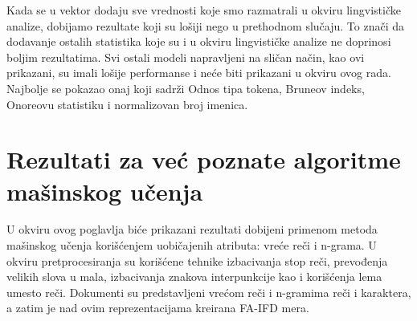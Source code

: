 \documentclass[12pt,oneside]{memoir}
\begin{document}
\noindent{}
\newline
\newline
Kada se u vektor dodaju sve vrednosti koje smo razmatrali u okviru lingvističke analize,  dobijamo rezultate koji su lošiji nego u prethodnom slučaju. To znači da dodavanje ostalih statistika koje su i u okviru lingvističke analize ne doprinosi boljim rezultatima.  Svi ostali modeli napravljeni na sličan način, kao ovi prikazani, su imali lošije performanse i neće biti prikazani u okviru ovog rada.  Najbolje se pokazao onaj koji sadrži Odnos tipa tokena, Bruneov indeks, Onoreovu statistiku i normalizovan broj imenica. 
\newpage
\section{Rezultati za već poznate algoritme mašinskog učenja}

U okviru ovog poglavlja biće prikazani rezultati dobijeni primenom metoda mašinskog učenja korišćenjem uobičajenih atributa: vreće reči i n-grama.  U okviru pretprocesiranja su korišćene tehnike izbacivanja stop reči,  prevođenja velikih slova u mala,  izbacivanja znakova interpunkcije kao i korišćenja lema umesto reči.  Dokumenti su predstavljeni vrećom reči i n-gramima reči i karaktera, a zatim je nad ovim reprezentacijama kreirana FA-IFD mera.  
\end{document}

